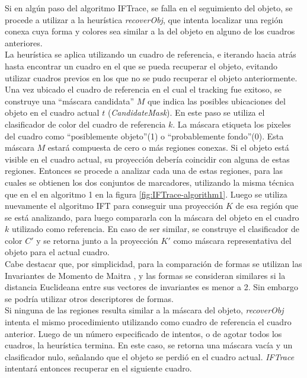 \documentclass[a4paper,10pt]{article}
\begin{document}
Si en algún paso del algoritmo IFTrace, se falla en el seguimiento del objeto, se 
procede a utilizar a la heurística \textit{recoverObj}, que intenta localizar una
región conexa cuya forma y colores sea similar a la del objeto en alguno de los 
cuadros anteriores.\\

La heurística se aplica utilizando un cuadro de referencia, e iterando hacia atrás
hasta encontrar un cuadro en el que se pueda recuperar el objeto, evitando 
utilizar cuadros previos en los que no se pudo recuperar el objeto anteriormente.
Una vez ubicado el cuadro de referencia en el cual el tracking fue exitoso, 
se construye una ``máscara candidata'' $M$ que indica las posibles ubicaciones
del objeto en el cuadro actual $t$ (\textit{CandidateMask}). En este paso se 
utiliza el clasificador de color del cuadro de referencia $k$. La máscara 
etiqueta los pixeles del cuadro como ``posiblemente objeto''(1) o 
``probablemente fondo''(0). Esta máscara $M$ estará compuesta de cero
o más regiones conexas. Si el objeto está visible en el cuadro actual, 
su proyección debería coincidir con alguna de estas regiones. Entonces 
se procede a analizar cada una de estas regiones, para las cuales se obtienen
los dos conjuntos de marcadores, utilizando la misma técnica que en el
en algoritmo 1 en la figura \ref{fig:IFTrace-algorithm1}. Luego se utiliza 
nuevamente el algoritmo IFT para conseguir una proyección $K$ de esa región que 
se está analizando, para luego compararla con la máscara del objeto en el cuadro
$k$ utilizado como referencia. En caso de ser similar, se construye el clasificador
de color $C'$ y se retorna junto a la proyección $K'$ como máscara representativa 
del objeto para el actual cuadro. \\
Cabe destacar que, por simplicidad, para la comparación de formas se utilizan
las Invariantes de Momento de Maitra \cite{MaitraMomentInvariants}, y las formas se consideran similares
si la distancia Euclideana entre sus vectores de invariantes es menor a 2. 
Sin embargo se podría utilizar otros descriptores de formas.\\
Si ninguna de las regiones resulta similar a la máscara del objeto, 
\textit{recoverObj} intenta el mismo procedimiento utilizando como cuadro de 
referencia el cuadro anterior. Luego de un número especificado de intentos, o
de agotar todos los cuadros, la heurística termina. En este caso, se retorna
una máscara vacía y un clasificador nulo, señalando que el objeto se perdió en
el cuadro actual. \textit{IFTrace} intentará entonces recuperar en el siguiente 
cuadro.
\end{document}

